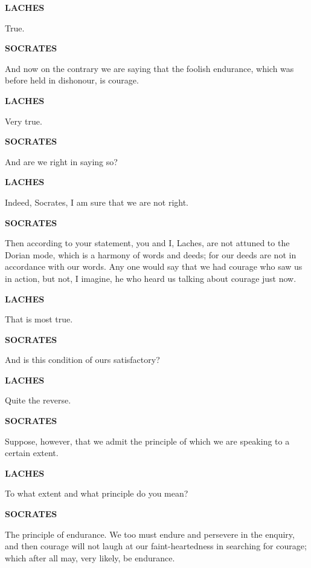\documentclass[11pt,letter]{book}
\begin{document}
\par \textbf{LACHES}
\par   True.

\par \textbf{SOCRATES}
\par   And now on the contrary we are saying that the foolish endurance, which was before held in dishonour, is courage.

\par \textbf{LACHES}
\par   Very true.

\par \textbf{SOCRATES}
\par   And are we right in saying so?

\par \textbf{LACHES}
\par   Indeed, Socrates, I am sure that we are not right.

\par \textbf{SOCRATES}
\par   Then according to your statement, you and I, Laches, are not attuned to the Dorian mode, which is a harmony of words and deeds; for our deeds are not in accordance with our words. Any one would say that we had courage who saw us in action, but not, I imagine, he who heard us talking about courage just now.

\par \textbf{LACHES}
\par   That is most true.

\par \textbf{SOCRATES}
\par   And is this condition of ours satisfactory?

\par \textbf{LACHES}
\par   Quite the reverse.

\par \textbf{SOCRATES}
\par   Suppose, however, that we admit the principle of which we are speaking to a certain extent.

\par \textbf{LACHES}
\par   To what extent and what principle do you mean?

\par \textbf{SOCRATES}
\par   The principle of endurance. We too must endure and persevere in the enquiry, and then courage will not laugh at our faint-heartedness in searching for courage; which after all may, very likely, be endurance.
\end{document}
